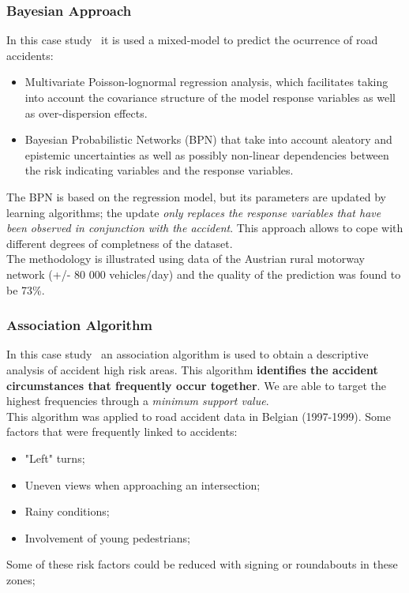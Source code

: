 \documentclass[hyperref={pdfpagelabels=true}]{beamer}
\begin{document}
\begin{frame}
\frametitle{Bayesian Approach}
In this case study~\cite{bayesian} it is used a mixed-model to predict the ocurrence of road accidents:
\begin{itemize}
\item<2-> Multivariate Poisson-lognormal regression analysis, which facilitates taking into account the covariance structure of the model response variables as well as
over-dispersion effects.
\item<3->  Bayesian Probabilistic Networks (BPN) that take into account aleatory and epistemic uncertainties as well as possibly non-linear dependencies between the risk indicating variables and the response variables.
\end{itemize}
The BPN is based on the regression model, but its parameters are updated by learning algorithms; the update \textit{only replaces the response variables that have been observed in conjunction with the accident}. This approach allows to cope with different degrees of completness of the dataset.\\
The methodology is illustrated using data of the Austrian rural motorway network (+/- 80 000 vehicles/day) and the quality of the prediction was found to be 73\%.
\end{frame}

\begin{frame}
\frametitle{Association Algorithm}
In this case study~\cite{sets} an association algorithm is used to obtain a descriptive analysis of accident high risk areas. This algorithm \textbf{identifies the accident circumstances that frequently occur together}. We are able to target the highest frequencies through a \textit{minimum support value}.\\
This algorithm was applied to road accident data in Belgian (1997-1999). 
Some factors that were frequently linked to accidents:
\begin{itemize}
\item "Left" turns;
\item Uneven views when approaching an intersection;
\item Rainy conditions;
\item Involvement of young pedestrians;
\end{itemize}
Some of these risk factors could be reduced with signing or roundabouts in these zones;
\end{frame}
\end{document}
